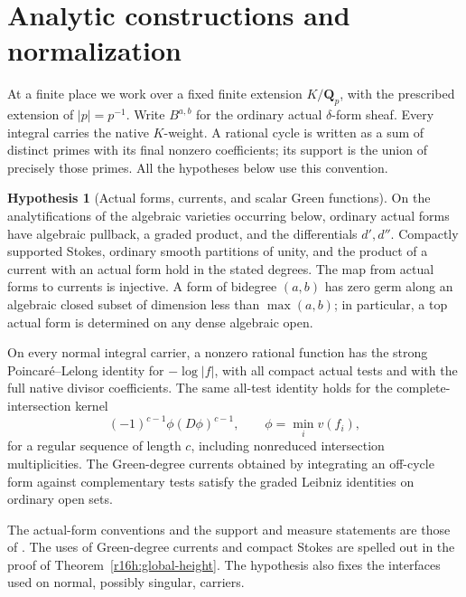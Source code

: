 \documentclass[11pt,a4paper]{article}
\theoremstyle{definition}
\newtheorem{hypothesis}[theorem]{Hypothesis}
\theoremstyle{remark}
\numberwithin{equation}{section}
\begin{document}
\section{Analytic constructions and normalization}\label{sec:height-hypotheses}

At a finite place we work over a fixed finite extension $K/\mathbf Q_p$, with the prescribed extension of $|p|=p^{-1}$. Write $B^{a,b}$ for the ordinary actual $\delta$-form sheaf. Every integral carries the native $K$-weight. A rational cycle is written as a sum of distinct primes with its final nonzero coefficients; its support is the union of precisely those primes. All the hypotheses below use this convention.

\begin{hypothesis}[Actual forms, currents, and scalar Green functions]\label{hyp:height-calculus}
On the analytifications of the algebraic varieties occurring below, ordinary actual forms have algebraic pullback, a graded product, and the differentials $d',d''$. Compactly supported Stokes, ordinary smooth partitions of unity, and the product of a current with an actual form hold in the stated degrees. The map from actual forms to currents is injective. A form of bidegree $(a,b)$ has zero germ along an algebraic closed subset of dimension less than $\max(a,b)$; in particular, a top actual form is determined on any dense algebraic open.

On every normal integral carrier, a nonzero rational function has the strong Poincar\'e--Lelong identity for $-\log|f|$, with all compact actual tests and with the full native divisor coefficients. The same all-test identity holds for the complete-intersection kernel
\[
 (-1)^{c-1}\phi(D\phi)^{c-1},\qquad
 \phi=\min_i v(f_i),
\]
for a regular sequence of length $c$, including nonreduced intersection multiplicities. The Green-degree currents obtained by integrating an off-cycle form against complementary tests satisfy the graded Leibniz identities on ordinary open sets.
\end{hypothesis}

The actual-form conventions and the support and measure statements are those of \cite{M}. The uses of Green-degree currents and compact Stokes are spelled out in the proof of Theorem~\ref{r16h:global-height}. The hypothesis also fixes the interfaces used on normal, possibly singular, carriers.
\end{document}
